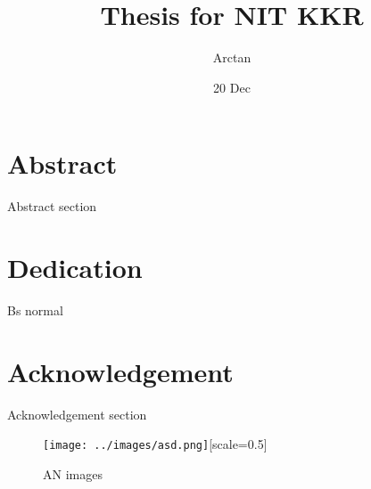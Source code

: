 \documentclass{report}
\title{Thesis for \Large{NIT KKR}}
\author{Arctan}
\date{20 Dec}
\begin{document}
\maketitle    

\chapter*{Abstract}
Abstract section

\chapter*{Dedication}
Bs normal 


\chapter*{Acknowledgement}
Acknowledgement section

\tableofcontents

\begin{figure}[h]
    \centering
    \texttt{[image: ../images/asd.png]}[scale=0.5]
    \caption{AN images}
    \label{fig:img1}
\end{figure}


\appendix

\end{document}
